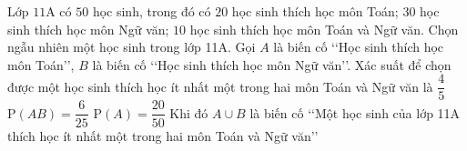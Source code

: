 \begin{ex}%

	Lớp $11$A có $50$ học sinh, trong đó có $20$ học sinh thích học môn Toán; $30$ học sinh thích học môn Ngữ văn; $10$ học sinh thích học môn Toán và Ngữ văn. Chọn ngẫu nhiên một học sinh trong lớp 11A. Gọi $A$ là biến cố \lq\lq Học sinh thích học môn Toán\rq\rq, $B$ là biến cố \lq\lq Học sinh thích học môn Ngữ văn\rq\rq.
	\choiceTF
	{\True Xác suất để chọn được một học sinh thích học ít nhất một trong hai môn Toán và Ngữ văn là $\dfrac{4}{5}$}
	{$\mathrm P(AB)=\dfrac{6}{25}$}
	{\True $\mathrm P(A)=\dfrac{20}{50}$}
	{\True Khi đó $A \cup B$ là biến cố \lq\lq Một học sinh của lớp 11A thích học ít nhất một trong hai môn Toán và Ngữ văn\rq\rq}
\end{ex}

